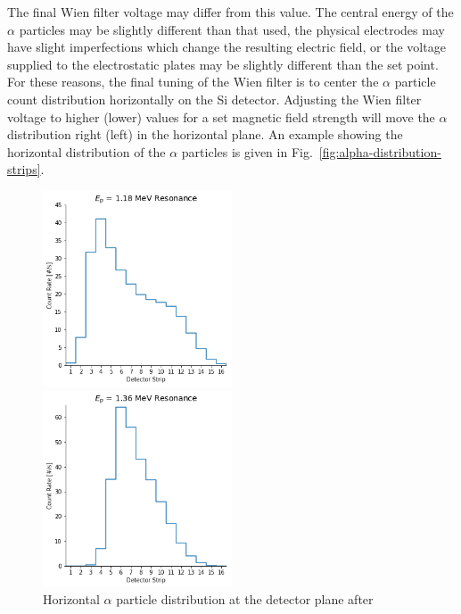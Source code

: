 The final Wien filter voltage may differ from this value. The central
energy of the $\alpha$ particles may be slightly different than that
used, the physical electrodes may have slight imperfections which change
the resulting electric field, or the voltage supplied to the
electrostatic plates may be slightly different than the set point. For
these reasons, the final tuning of the Wien filter is to center the
$\alpha$ particle count distribution horizontally on the Si detector.
Adjusting the Wien filter voltage to higher (lower) values for a set
magnetic field strength will move the $\alpha$ distribution right (left)
in the horizontal plane. An example showing the horizontal
distribution of the $\alpha$ particles is given in
Fig.~\ref{fig:alpha-distribution-strips}.

\begin{figure}[h]
    \begin{center}
        \centerline{
            \includegraphics[width=0.5\textwidth]{figures/low_resonance_detector_strips.png}}
        \centerline{
            \includegraphics[width=0.5\textwidth]{figures/high_resonance_detector_strips.png}
        }
        \caption[Horizontal $\alpha$ particle distribution]{Horizontal
            $\alpha$ particle distribution at the detector plane after
}
\end{center}
\end{figure}
